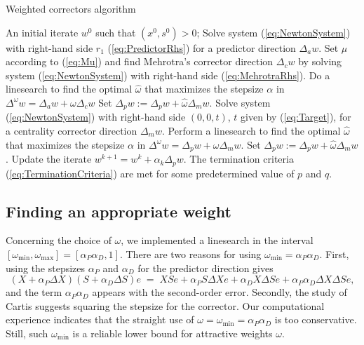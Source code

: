 \begin{algorithm}[ht]
  \caption{Weighted correctors algorithm}
    \begin{algorithmic}[0]  \label{alg:WeightedCorrectors}
      \REQUIRE An initial iterate $w^0$ such that $(x^0, s^0) > 0$;
      \smallskip
      \REPEAT
        \STATE Solve system (\ref{eq:NewtonSystem}) with right-hand side $r_1$
	       (\ref{eq:PredictorRhs}) for a predictor direction $\Delta_a w$.
        \smallskip
        \STATE Set $\mu$ according to (\ref{eq:Mu}) and find Mehrotra's
               corrector direction $\Delta_c w$ by solving system
               (\ref{eq:NewtonSystem}) with right-hand side
               (\ref{eq:MehrotraRhs}).
        \smallskip
        \STATE Do a linesearch to find the optimal $\hat\omega$ that
               maximizes the stepsize $\alpha$ in
               $\Delta^\omega w = \Delta_a w +\omega\Delta_c w$
        \smallskip
	\STATE Set $\Delta_p w := \Delta_p w +\hat\omega\Delta_m w$. 
        \smallskip
           \smallskip
           \STATE Solve system (\ref{eq:NewtonSystem}) with right-hand side
                  $(0,0,t)$, $t$ given by (\ref{eq:Target}), for a centrality
                 corrector direction $\Delta_m w$.
           \smallskip
	   \STATE Perform a linesearch to find the optimal $\hat\omega$ that
                  maximizes the stepsize $\alpha$ in
                  $\Delta^\omega w = \Delta_p w +\omega\Delta_m w$.
           \smallskip
           \STATE Set $\Delta_p w := \Delta_p w +\hat\omega\Delta_m w$.
           \smallskip
        \ENDWHILE
        \STATE Update the iterate $w^{k+1} = w^k + \alpha_k\Delta_p w$.
        \smallskip
      \UNTIL The termination criteria (\ref{eq:TerminationCriteria}) are met
             for some predetermined value of $p$ and $q$.
  \end{algorithmic}
\end{algorithm}

%
%
\subsection{Finding an appropriate weight}

Concerning the choice of $\omega$, we implemented a linesearch in
the interval $[\omega_{\min},\omega_{\max}]=[\alpha_P\alpha_D, 1]$. 
There are two reasons for using  $\omega_{\min} = \alpha_P\alpha_D$. 
First, using the stepsizes $\alpha_P$ and $\alpha_D$ for the predictor
direction gives 
\[
(X + \alpha_P \Delta X) (S + \alpha_D \Delta S) e 
\;=\; XSe + \alpha_P S\Delta Xe + \alpha_D X\Delta Se 
          + \alpha_P\alpha_D \Delta X\Delta S e,
\]
and the term $\alpha_P\alpha_D$ appears with the second-order error. 
Secondly, the study of Cartis \cite{Cartis04} suggests squaring 
the stepsize for the corrector. Our computational experience indicates 
that the straight use of $\omega = \omega_{\min} = \alpha_P\alpha_D$
is too conservative. Still, such $\omega_{\min}$ is a reliable lower 
bound for attractive weights $\omega$. 

